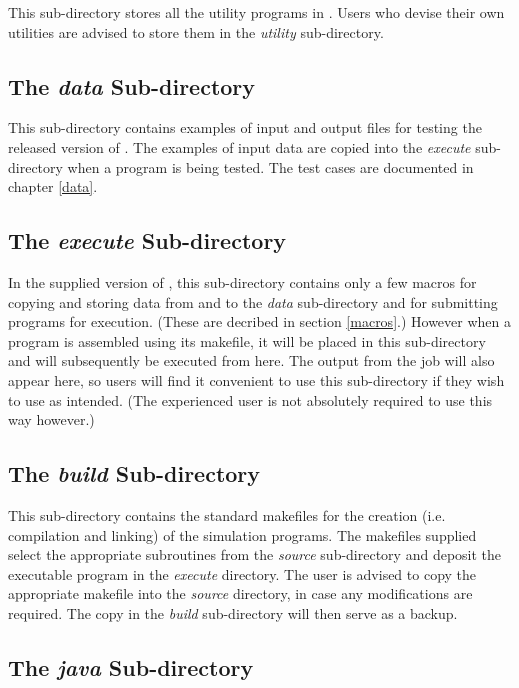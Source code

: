 This sub-directory stores all the utility programs in \D.  Users who devise
their own utilities are advised to store them in the {\em utility}
sub-directory.

\subsection{The {\em data} Sub-directory}

This sub-directory contains examples of input and output files for
testing the released version of \D. The examples of input data
are copied into the {\em execute} sub-directory when a program is being
tested. The test cases are documented in chapter \ref{data}.

\subsection{The {\em execute} Sub-directory}

In the supplied version of \D{}, this sub-directory contains only
a few macros for copying and storing data from and to the {\em data}
sub-directory and for submitting programs for execution. (These are
decribed in section \ref{macros}.) However when
a \D{} program is assembled using its makefile, it will be placed
in this sub-directory and will subsequently be executed from here. The
output from the job will also appear here, so users will find it
convenient to use this sub-directory if they wish to use \D{} as
intended. (The experienced user is not absolutely required to use
\D{} this way however.)

\subsection{The {\em build} Sub-directory}

This sub-directory contains the standard makefiles for the creation
(i.e. compilation and linking) of the \D{} simulation programs.
The makefiles supplied select the appropriate subroutines from the
{\em source} sub-directory and deposit the executable program in the
{\em execute} directory. The user is advised to copy the appropriate
makefile into the {\em source} directory, in case any modifications are
required. The copy in the {\em build} sub-directory will then serve as a
backup. 

\subsection{The {\em java} Sub-directory}

